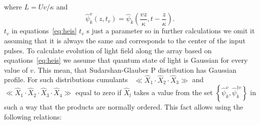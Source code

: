 \documentclass[9pt,twocolumn,twoside]{osajnl}
\begin{document}
where $L=Uv/\kappa$ and
\begin{equation}
	\hat{\psi}^{v}_k\!\left(z,\!t_v\!\right) = \hat{\psi}^{\phantom{\dag}}_k\!\left(\dfrac{vz}{\kappa},\!t - \dfrac{z}{\kappa}\!\right).
\end{equation}
$t_v$ in equations~\eqref{eq:heis} $t_v$ s just a parameter so in further calculations we omit it assuming that it is always the same and corresponds to the center of the input pulses. 
To calculate evolution of light field along the array based on equations~\eqref{eq:heis} we assume that quantum state of light is Gaussian for every value of $v$. 
This mean, that Sudarshan-Glauber P distribution has Gaussian profile. 
For such distributions cumulants~\cite{gardiner_stochastic_2009} $\ll\hat{X}_1\cdot\hat{X}_2\cdot\hat{X}_3\gg$ and $\ll\hat{X}_1\cdot\hat{X}_2\cdot\hat{X}_3\cdot\hat{X}_4\gg$ equal to zero if $\hat{X}_l$ takes a value from the set $\left\{\hat{\psi}^{v}_{k}, \hat{\psi}^{\dag v}_{k} \right\}$ in such a way that the products are normally ordered. This fact allows using the following relations:
\end{document}
